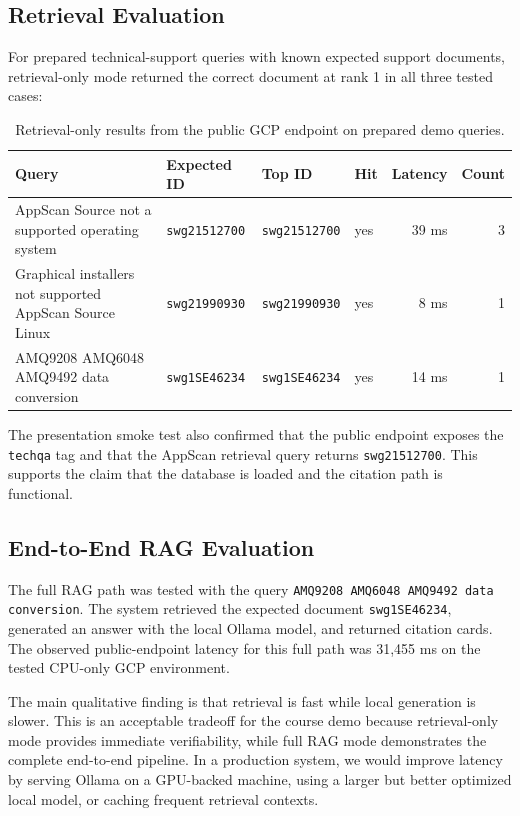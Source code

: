 \documentclass[paper=a4, fontsize=11pt]{scrartcl}
\begin{document}
\subsection{Retrieval Evaluation}

For prepared technical-support queries with known expected support documents, retrieval-only mode returned the correct document at rank 1 in all three tested cases:

\begin{table}[h]
\centering
\small
\begin{tabularx}{\textwidth}{>{\raggedright\arraybackslash}Xlllrr}
\toprule
Query & Expected ID & Top ID & Hit & Latency & Count \\
\midrule
AppScan Source not a supported operating system & \texttt{swg21512700} & \texttt{swg21512700} & yes & 39 ms & 3 \\
Graphical installers not supported AppScan Source Linux & \texttt{swg21990930} & \texttt{swg21990930} & yes & 8 ms & 1 \\
AMQ9208 AMQ6048 AMQ9492 data conversion & \texttt{swg1SE46234} & \texttt{swg1SE46234} & yes & 14 ms & 1 \\
\bottomrule
\end{tabularx}
\caption{Retrieval-only results from the public GCP endpoint on prepared demo queries.}
\end{table}

The presentation smoke test also confirmed that the public endpoint exposes the \texttt{techqa} tag and that the AppScan retrieval query returns \texttt{swg21512700}. This supports the claim that the database is loaded and the citation path is functional.

\subsection{End-to-End RAG Evaluation}

The full RAG path was tested with the query \texttt{AMQ9208 AMQ6048 AMQ9492 data conversion}. The system retrieved the expected document \texttt{swg1SE46234}, generated an answer with the local Ollama model, and returned citation cards. The observed public-endpoint latency for this full path was 31,455 ms on the tested CPU-only GCP environment.

The main qualitative finding is that retrieval is fast while local generation is slower. This is an acceptable tradeoff for the course demo because retrieval-only mode provides immediate verifiability, while full RAG mode demonstrates the complete end-to-end pipeline. In a production system, we would improve latency by serving Ollama on a GPU-backed machine, using a larger but better optimized local model, or caching frequent retrieval contexts.
\end{document}
